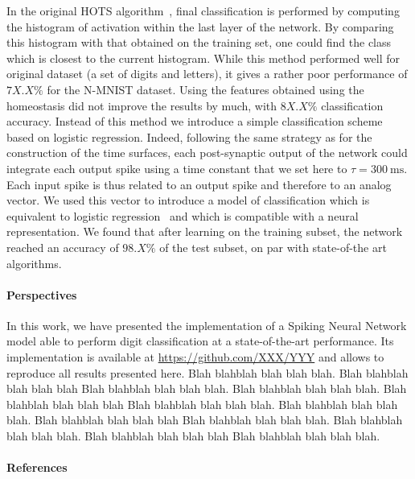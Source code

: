 \documentclass[12pt]{article}
\newcommand{\citep}[1]{\parencite{#1}}
\newcommand{\citet}[1]{\textcite{#1}}
\newcommand{\ms}{\si{\milli\second}}%
\begin{document}
In the original HOTS algorithm~\citet{Lagorce17}, final classification is performed by computing the histogram of activation within the last layer of the network. By comparing this histogram with that obtained on the training set, one could find the class which is closest to the current histogram. While this method performed well for original dataset (a set of digits and letters), it gives a rather poor performance of $7X.X\%$ for the N-MNIST dataset. Using the features obtained using the homeostasis did not improve the results by much, with $8X.X\%$ classification accuracy. 
Instead of this method we introduce a simple classification scheme based on logistic regression. Indeed, following the same strategy as for the construction of the time surfaces, each post-synaptic output of the network could integrate each output spike using a time constant that we set here to $\tau=300~\ms$. Each input spike is thus related to an output spike and therefore to an analog vector. We used this vector to introduce a model of classification which is equivalent to logistic regression~\citep{Berens12} and which is compatible with a neural representation. We found that after learning on the training subset, the network reached an accuracy of $98.X\%$ of the test subset, on par with state-of-the art algorithms.
%
\paragraph*{Perspectives}
In this work, we have presented the implementation of a Spiking Neural Network model able to perform digit classification at a state-of-the-art performance. Its implementation is available at \url{https://github.com/XXX/YYY} and allows to reproduce all results presented here. %
Blah blahblah blah blah blah. Blah blahblah blah blah blah Blah blahblah blah blah blah.
Blah blahblah blah blah blah. Blah blahblah blah blah blah Blah blahblah blah blah blah.
Blah blahblah blah blah blah. Blah blahblah blah blah blah Blah blahblah blah blah blah.
Blah blahblah blah blah blah. Blah blahblah blah blah blah Blah blahblah blah blah blah.
%
\paragraph*{References}
{
\small
\printbibliography[heading=none]
}


\end{document}
